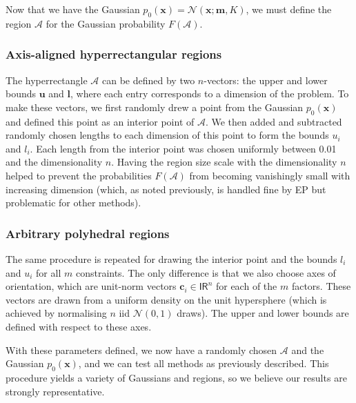 \documentclass[twoside,11pt]{article}
\def\x{{\mathbf x}}
\def\c{{\mathbf c}}
\def\l{{\mathbf l}}
\def\u{{\mathbf u}}
\def\m{{\mathbf m}}
\def\regionA{\mathcal{A}}
\newcommand{\reals}{\mathsf{I\!R}}
\begin{document}
Now that we have the Gaussian $p_0(\x) = \mathcal{N}(\x; \m,K)$,
we must define the region $\regionA$ for the Gaussian probability
$F(\regionA)$.  

\subsubsection{Axis-aligned hyperrectangular regions}  

The hyperrectangle $\regionA$ can be defined by two
$n$-vectors: the upper and lower bounds $\u$ and $\l$, where each entry corresponds to a dimension of the problem.  To make
these vectors, we first randomly drew a point from the Gaussian
$p_0(\x)$ and defined this point as an interior point of
$\regionA$.  We then added and subtracted randomly chosen lengths to
each dimension of this point to form the bounds $u_i$ and $l_i$.  Each length from the interior point was chosen uniformly between 0.01 and the dimensionality $n$.  Having the region size scale with the dimensionality $n$ helped to prevent the probabilities $F(\regionA)$ from becoming vanishingly small with increasing dimension (which, as noted previously, is handled fine by EP but problematic for other methods).  

\subsubsection{Arbitrary polyhedral regions}

The same procedure is repeated for drawing the interior point and the bounds $l_i$ and $u_i$ for all $m$ constraints.  The only difference is that we also choose axes of orientation, which are unit-norm vectors $\c_i \in \reals^n$ for each of the $m$ factors.  These vectors are drawn from a uniform density on the unit hypersphere (which is achieved by normalising $n$ iid $\mathcal{N}(0,1)$ draws).  The upper and lower bounds are defined with respect to these axes.

With these parameters defined, we now have a randomly
chosen $\regionA$ and the Gaussian $p_0(\x)$, and we can test all methods as previously described.  This
procedure yields a variety of Gaussians and regions, so we believe our results
are strongly representative. 
\end{document}
